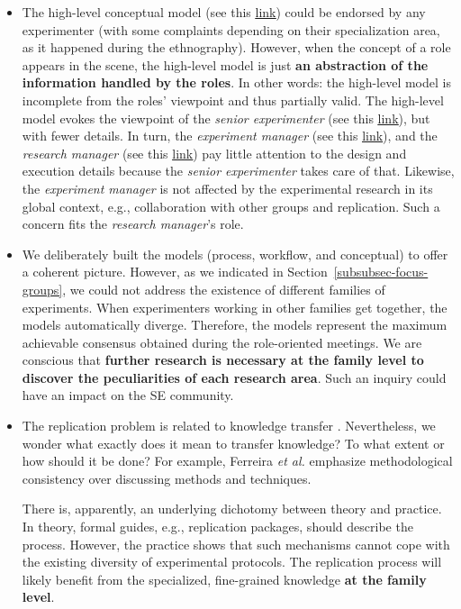 \begin{itemize}
	\item The high-level conceptual model (see this \href{https://zenodo.org/record/7102405#.YyxvFOzMLUK}{\ul{link}}) could be endorsed by any experimenter (with some complaints depending on their specialization area, as it happened during the ethnography). However, when the concept of a role appears in the scene, the high-level model is just \textbf{an abstraction of the information handled by the roles}. In other words: the high-level model is incomplete from the roles' viewpoint and thus partially valid. The high-level model evokes the viewpoint of the \textit{senior experimenter} (see this \href{https://zenodo.org/record/7102464#.YyxvsezMLUK}{\ul{link}}), but with fewer details. In turn, the \textit{experiment manager} (see this \href{https://zenodo.org/record/7102450#.Yyxv6ezMLUL}{\ul{link}}), and the \textit{research manager} (see this \href{https://zenodo.org/record/7102431#.YyxwGezMLUL}{\ul{link}}) pay little attention to the design and execution details because the \textit{senior experimenter} takes care of that. Likewise, the \textit{experiment manager} is not affected by the experimental research in its global context, e.g., collaboration with other groups and replication. Such a concern fits the \textit{research manager}'s role. 
\item We deliberately built the models (process, workflow, and conceptual) to offer a coherent picture. However, as we indicated in Section~\ref{subsubsec-focus-groups}, we could not address the existence of different families of experiments. When experimenters working in other families get together, the models automatically diverge. Therefore, the models represent the maximum achievable consensus obtained during the role-oriented meetings. We are conscious that \textbf{further research is necessary at the family level to discover the peculiarities of each research area}. Such an inquiry could have an impact on the SE community. 
\item The replication problem is related to knowledge transfer \cite{Shull-2004-Knowledge-sharing-issues-SE,collins2022collective}. Nevertheless, we wonder what exactly does it mean to transfer knowledge? To what extent or how should it be done? For example, Ferreira \textit{et al.} \cite{Ferreira-2017-planning-experiments} emphasize methodological consistency over discussing methods and techniques. 

There is, apparently, an underlying dichotomy between theory and practice. In theory, formal guides, e.g., replication packages, should describe the process. However, the practice shows that such mechanisms cannot cope with the existing diversity of experimental protocols. The replication process will likely benefit from the specialized, fine-grained knowledge \textbf{at the family level}.
\end{itemize}

